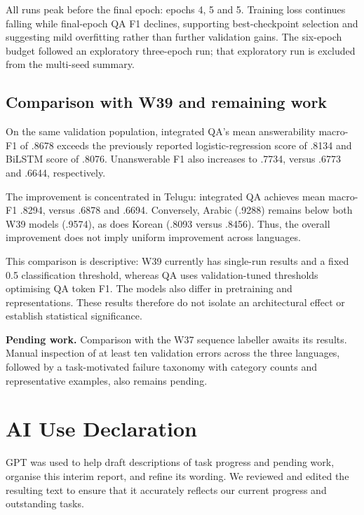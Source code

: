 \documentclass[11pt,a4paper]{article}
\begin{document}
All runs peak before the final epoch: epochs 4, 5 and 5.
Training loss continues falling while final-epoch QA F1
declines, supporting best-checkpoint selection and suggesting
mild overfitting rather than further validation gains.
The six-epoch budget followed an exploratory three-epoch
run; that exploratory run is excluded from the multi-seed
summary.

\subsection{Comparison with W39 and remaining work}
On the same validation population, integrated QA's mean
answerability macro-F1 of .8678 exceeds the previously
reported logistic-regression score of .8134 and BiLSTM
score of .8076. Unanswerable F1 also increases to .7734,
versus .6773 and .6644, respectively.

The improvement is concentrated in Telugu: integrated QA
achieves mean macro-F1 .8294, versus .6878 and .6694.
Conversely, Arabic (.9288) remains below both W39 models
(.9574), as does Korean (.8093 versus .8456).
Thus, the overall improvement does not imply uniform
improvement across languages.

This comparison is descriptive: W39 currently has single-run
results and a fixed 0.5 classification threshold, whereas QA
uses validation-tuned thresholds optimising QA token F1.
The models also differ in pretraining and representations.
These results therefore do not isolate an architectural
effect or establish statistical significance.

\textbf{Pending work.}
Comparison with the W37 sequence labeller awaits its results.
Manual inspection of at least ten validation errors across
the three languages, followed by a task-motivated failure
taxonomy with category counts and representative examples,
also remains pending.


\section*{AI Use Declaration}
GPT was used to help draft descriptions of task progress and pending work, organise this interim report, and refine its wording. We reviewed and edited the resulting text to ensure that it accurately reflects our current progress and outstanding tasks.
\end{document}
